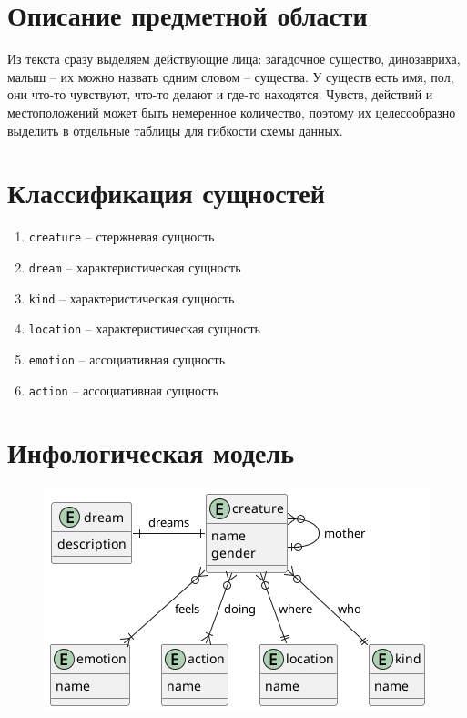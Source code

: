 \documentclass{article}
\begin{document}
\section{Описание предметной области}

Из текста сразу выделяем действующие лица:
загадочное существо, динозавриха,
малыш -- их можно назвать одним словом --
существа. У существ есть имя, пол, они что-то
чувствуют, что-то делают и где-то находятся.
Чувств, действий и местоположений может быть
немеренное количество, поэтому их целесообразно
выделить в отдельные таблицы для гибкости схемы
данных.

\section{Классификация сущностей}

\begin{enumerate}
    \item \texttt{creature} -- стержневая сущность
    \item \texttt{dream} -- характеристическая сущность
    \item \texttt{kind} -- характеристическая сущность
    \item \texttt{location} -- характеристическая сущность
    \item \texttt{emotion} -- ассоциативная сущность
    \item \texttt{action} -- ассоциативная сущность
\end{enumerate}

\section{Инфологическая модель}

\begin{figure}[th]
    \includegraphics[scale=0.5]{./high-er-diagram.png}
    \centering
\end{figure}
\end{document}
